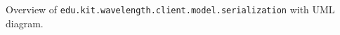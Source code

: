 \renewcommand\pkg{edu.kit.wavelength.client.model.serialization}

Overview of \texttt{\pkg} with UML diagram.
